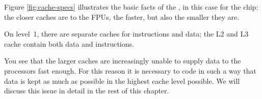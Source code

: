 
Figure \ref{fig:cache-specs} illustrates the basic facts of the
, in
this case for the  chip: the
closer caches are to the \acp{FPU}, the faster, but also the
smaller they are.

On level~1, there are separate caches for instructions and data; the
L2 and L3 cache contain both data and instructions.

You see that the larger caches are increasingly unable to supply data
to the processors fast enough. For this reason it is necessary to code
in such a way that data is kept as much as possible in the highest
cache level possible. We will discuss this issue in detail in the rest
of this chapter.


